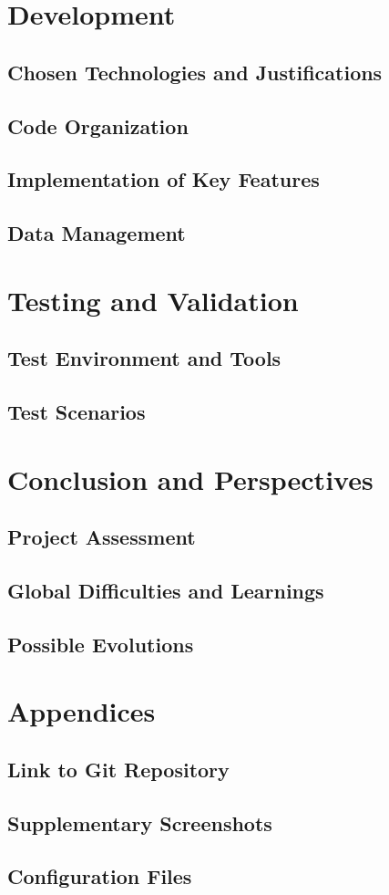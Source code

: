 \documentclass[12pt,a4paper]{report}
\begin{document}
\chapter{Development}
\section{Chosen Technologies and Justifications}
\section{Code Organization}
\section{Implementation of Key Features}
\section{Data Management}

\chapter{Testing and Validation}
\section{Test Environment and Tools}
\section{Test Scenarios}

\chapter{Conclusion and Perspectives}
\section{Project Assessment}
\section{Global Difficulties and Learnings}
\section{Possible Evolutions}

\chapter{Appendices}
\section{Link to Git Repository}
\section{Supplementary Screenshots}
\section{Configuration Files}
\end{document}
